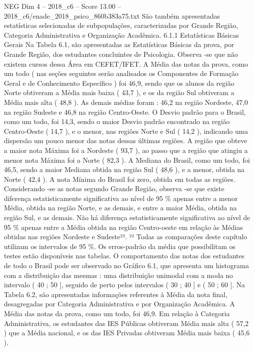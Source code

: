 \begin{textsample}{NEG Dim 4 – 2018\_c6 – Score 13.00 – 2018\_c6/enade\_2018\_psico\_860b383a75.txt}
São também apresentadas estatísticas selecionadas de subpopulações, caracterizadas por Grande Região, Categoria Administrativa e Organização Acadêmica. 6.1.1 Estatísticas Básicas Gerais Na Tabela 6.1, são apresentadas as Estatísticas Básicas da prova, por Grande Região, dos estudantes concluintes de Psicologia.
Observa -se que não existem cursos dessa Área em CEFET/IFET.
A Média das notas da prova, como um todo ( nas seções seguintes serão analisados os Componentes de Formação Geral e de Conhecimento Específico ) foi 46,9, sendo que os alunos da região Norte obtiveram a Média mais baixa ( 43,7 ), e os da região Sul obtiveram a Média mais alta ( 48,8 ).
As demais médias foram : 46,2 na região Nordeste, 47,0 na região Sudeste e 46,8 na região Centro-Oeste.
O Desvio padrão para o Brasil, como um todo, foi 14,3, sendo o maior Desvio padrão encontrado na região Centro-Oeste ( 14,7 ), e o menor, nas regiões Norte e Sul ( 14,2 ), indicando uma dispersão um pouco menor das notas dessas últimas regiões.
A região que obteve a maior nota Máxima foi a Nordeste ( 93,7 ), ao passo que a região que atingiu a menor nota Máxima foi a Norte ( 82,3 ).
A Mediana do Brasil, como um todo, foi 46,5, sendo a maior Mediana obtida na região Sul ( 48,6 ), e a menor, obtida na Norte ( 42,4 ).
A nota Mínima do Brasil foi zero, obtida em todas as regiões.
Considerando -se as notas segundo Grande Região, observa -se que existe diferença estatisticamente significativa ao nível de 95 \% apenas entre a menor Média, obtida na região Norte, e as demais, e entre a maior Média, obtida na região Sul, e as demais.
Não há diferença estatisticamente significativa ao nível de 95 \% apenas entre a Média obtida na região Centro-oeste em relação às Médias obtidas nas regiões Nordeste e Sudeste²². ²² Todas as comparações deste capítulo utilizam os intervalos de 95 \%.
Os erros-padrão da média que possibilitam os testes estão disponíveis nas tabelas.
O comportamento das notas dos estudantes de todo o Brasil pode ser observado no Gráfico 6.1, que apresenta um histograma com a distribuição das mesmas : uma distribuição unimodal com a moda no intervalo ( 40 ; 50 ], seguido de perto pelos intervalos ( 30 ; 40 ] e ( 50 ; 60 ].
Na Tabela 6.2, são apresentadas informações referentes à Média da nota final, desagregadas por Categoria Administrativa e por Organização Acadêmica.
A Média das notas da prova, como um todo, foi 46,9.
Em relação à Categoria Administrativa, os estudantes das IES Públicas obtiveram Média mais alta ( 57,2 ) que a Média nacional, e os das IES Privadas obtiveram Média mais baixa ( 45,6 ).

\end{textsample}
